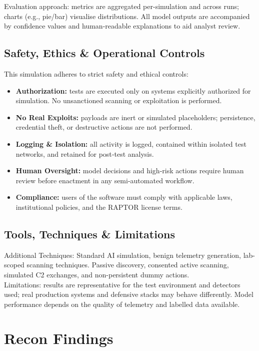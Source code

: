 \documentclass[a4paper,12pt]{article}
\begin{document}
Evaluation approach: metrics are aggregated per-simulation and across runs; charts (e.g., pie/bar) visualise distributions. All model outputs are accompanied by confidence values and human-readable explanations to aid analyst review.

\subsection*{Safety, Ethics \& Operational Controls}
This simulation adheres to strict safety and ethical controls:
\begin{itemize}
    \item \textbf{Authorization:} tests are executed only on systems explicitly authorized for simulation. No unsanctioned scanning or exploitation is performed.
    \item \textbf{No Real Exploits:} payloads are inert or simulated placeholders; persistence, credential theft, or destructive actions are not performed.
    \item \textbf{Logging \& Isolation:} all activity is logged, contained within isolated test networks, and retained for post‑test analysis.
    \item \textbf{Human Oversight:} model decisions and high‑risk actions require human review before enactment in any semi-automated workflow.
    \item \textbf{Compliance:} users of the software must comply with applicable laws, institutional policies, and the RAPTOR license terms.
\end{itemize}

\subsection*{Tools, Techniques \& Limitations}
Additional Techniques: Standard AI simulation, benign telemetry generation, lab-scoped scanning techniques. Passive discovery, consented active scanning, simulated C2 exchanges, and non-persistent dummy actions. \\[0.2cm]
Limitations: results are representative for the test environment and detectors used; real production systems and defensive stacks may behave differently. Model performance depends on the quality of telemetry and labelled data available.

\newpage


\section*{Recon Findings}
\end{document}
